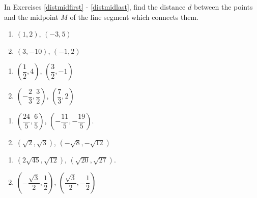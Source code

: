 In Exercises \ref{distmidfirst} - \ref{distmidlast}, find the distance $d$ between the points and the midpoint $M$ of the line segment which connects them.


\begin{multicols}{2}
\begin{enumerate}
\setcounter{enumi}{\value{HW}}

\item $(1,2)$, $(-3,5)$ \label{distmidfirst}
\item $(3, -10)$, $(-1, 2)$ 

\setcounter{HW}{\value{enumi}}
\end{enumerate}
\end{multicols}

\begin{multicols}{2}
\begin{enumerate}
\setcounter{enumi}{\value{HW}}

\item $\left( \dfrac{1}{2}, 4\right)$, $\left(\dfrac{3}{2}, -1\right)$ 
\item $\left(- \dfrac{2}{3}, \dfrac{3}{2} \right)$, $\left(\dfrac{7}{3}, 2\right)$ 

\setcounter{HW}{\value{enumi}}
\end{enumerate}
\end{multicols}


\begin{multicols}{2}
\begin{enumerate}
\setcounter{enumi}{\value{HW}}

\item  $\left( \dfrac{24}{5}, \dfrac{6}{5} \right)$, $\left( -\dfrac{11}{5}, -\dfrac{19}{5} \right)$.
\item $\left(\sqrt{2}, \sqrt{3}\right)$, $\left(-\sqrt{8}, -\sqrt{12}\right)$ 

\setcounter{HW}{\value{enumi}}
\end{enumerate}
\end{multicols}

\begin{enumerate}
\setcounter{enumi}{\value{HW}}

\item  $\left(2 \sqrt{45}, \sqrt{12} \right)$, $\left(\sqrt{20}, \sqrt{27} \right)$. 
\item $\left(-\dfrac{\sqrt{3}}{2}, \dfrac{1}{2} \right)$, $\left(\dfrac{\sqrt{3}}{2}, -\dfrac{1}{2} \right)$ \label{distmidlast}

\setcounter{HW}{\value{enumi}}
\end{enumerate}

